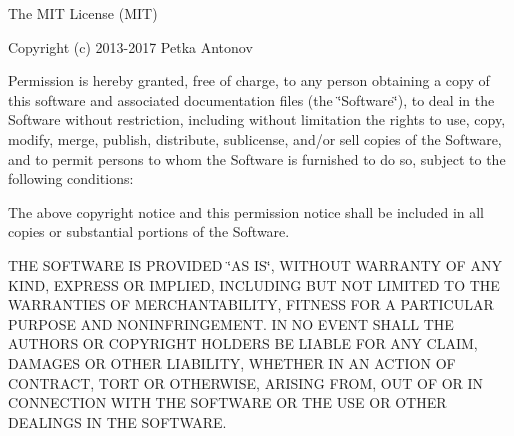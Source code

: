 The M\+IT License (M\+IT)

Copyright (c) 2013-\/2017 Petka Antonov

Permission is hereby granted, free of charge, to any person obtaining a copy of this software and associated documentation files (the \char`\"{}\+Software\char`\"{}), to deal in the Software without restriction, including without limitation the rights to use, copy, modify, merge, publish, distribute, sublicense, and/or sell copies of the Software, and to permit persons to whom the Software is furnished to do so, subject to the following conditions\+:

The above copyright notice and this permission notice shall be included in all copies or substantial portions of the Software.

T\+HE S\+O\+F\+T\+W\+A\+RE IS P\+R\+O\+V\+I\+D\+ED \char`\"{}\+A\+S I\+S\char`\"{}, W\+I\+T\+H\+O\+UT W\+A\+R\+R\+A\+N\+TY OF A\+NY K\+I\+ND, E\+X\+P\+R\+E\+SS OR I\+M\+P\+L\+I\+ED, I\+N\+C\+L\+U\+D\+I\+NG B\+UT N\+OT L\+I\+M\+I\+T\+ED TO T\+HE W\+A\+R\+R\+A\+N\+T\+I\+ES OF M\+E\+R\+C\+H\+A\+N\+T\+A\+B\+I\+L\+I\+TY, F\+I\+T\+N\+E\+SS F\+OR A P\+A\+R\+T\+I\+C\+U\+L\+AR P\+U\+R\+P\+O\+SE A\+ND N\+O\+N\+I\+N\+F\+R\+I\+N\+G\+E\+M\+E\+NT. IN NO E\+V\+E\+NT S\+H\+A\+LL T\+HE A\+U\+T\+H\+O\+RS OR C\+O\+P\+Y\+R\+I\+G\+HT H\+O\+L\+D\+E\+RS BE L\+I\+A\+B\+LE F\+OR A\+NY C\+L\+A\+IM, D\+A\+M\+A\+G\+ES OR O\+T\+H\+ER L\+I\+A\+B\+I\+L\+I\+TY, W\+H\+E\+T\+H\+ER IN AN A\+C\+T\+I\+ON OF C\+O\+N\+T\+R\+A\+CT, T\+O\+RT OR O\+T\+H\+E\+R\+W\+I\+SE, A\+R\+I\+S\+I\+NG F\+R\+OM, O\+UT OF OR IN C\+O\+N\+N\+E\+C\+T\+I\+ON W\+I\+TH T\+HE S\+O\+F\+T\+W\+A\+RE OR T\+HE U\+SE OR O\+T\+H\+ER D\+E\+A\+L\+I\+N\+GS IN T\+HE S\+O\+F\+T\+W\+A\+RE. 